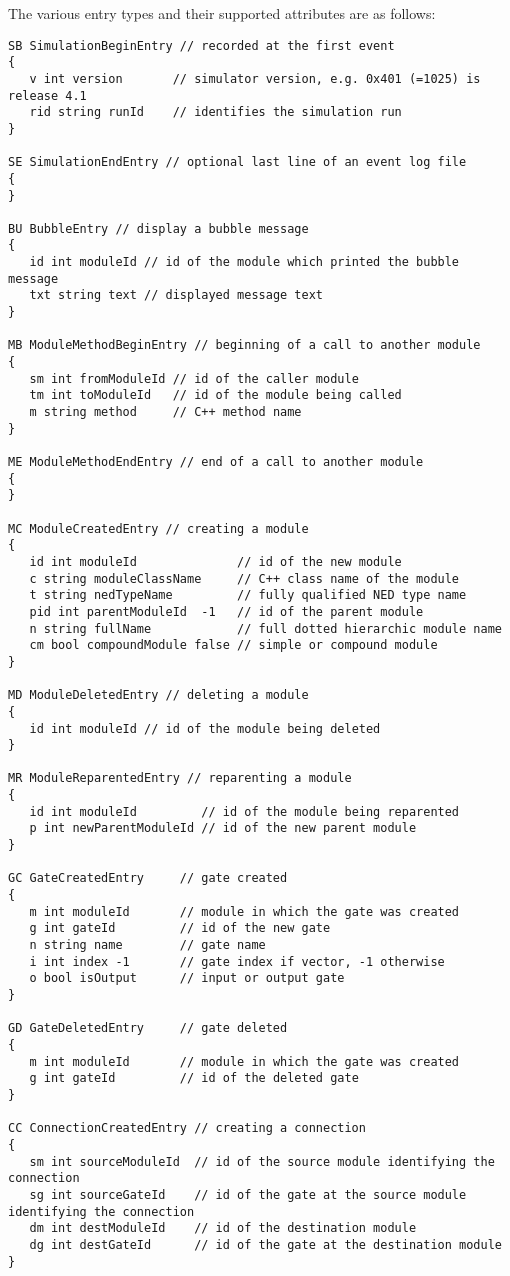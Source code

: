The various entry types and their supported attributes are as follows:

\begin{verbatim}
SB SimulationBeginEntry // recorded at the first event
{
   v int version       // simulator version, e.g. 0x401 (=1025) is release 4.1
   rid string runId    // identifies the simulation run
}

SE SimulationEndEntry // optional last line of an event log file
{
}

BU BubbleEntry // display a bubble message
{
   id int moduleId // id of the module which printed the bubble message
   txt string text // displayed message text
}

MB ModuleMethodBeginEntry // beginning of a call to another module
{
   sm int fromModuleId // id of the caller module
   tm int toModuleId   // id of the module being called
   m string method     // C++ method name
}

ME ModuleMethodEndEntry // end of a call to another module
{
}

MC ModuleCreatedEntry // creating a module
{
   id int moduleId              // id of the new module
   c string moduleClassName     // C++ class name of the module
   t string nedTypeName         // fully qualified NED type name
   pid int parentModuleId  -1   // id of the parent module
   n string fullName            // full dotted hierarchic module name
   cm bool compoundModule false // simple or compound module
}

MD ModuleDeletedEntry // deleting a module
{
   id int moduleId // id of the module being deleted
}

MR ModuleReparentedEntry // reparenting a module
{
   id int moduleId         // id of the module being reparented
   p int newParentModuleId // id of the new parent module
}

GC GateCreatedEntry     // gate created
{
   m int moduleId       // module in which the gate was created
   g int gateId         // id of the new gate
   n string name        // gate name
   i int index -1       // gate index if vector, -1 otherwise
   o bool isOutput      // input or output gate
}

GD GateDeletedEntry     // gate deleted
{
   m int moduleId       // module in which the gate was created
   g int gateId         // id of the deleted gate
}

CC ConnectionCreatedEntry // creating a connection
{
   sm int sourceModuleId  // id of the source module identifying the connection
   sg int sourceGateId    // id of the gate at the source module identifying the connection
   dm int destModuleId    // id of the destination module
   dg int destGateId      // id of the gate at the destination module
}


\end{verbatim}

